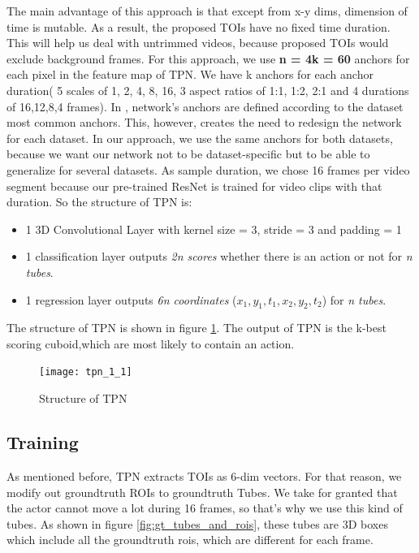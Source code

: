 The main advantage of this approach is that except from x-y dims, dimension of time is mutable. As a result, the proposed TOIs have
no fixed time duration. This will help us deal with untrimmed videos, because proposed TOIs would exclude background frames.
For this approach, we use \textbf{n = 4k = 60} anchors for each pixel in the feature map of TPN. We have k anchors for each anchor 
duration( 5 scales of 1, 2, 4, 8, 16, 3 aspect ratios of 1:1, 1:2, 2:1 and 4 durations of 16,12,8,4 frames).
In \cite{DBLP:journals/corr/HouCS17},  network's anchors are defined according to the dataset most common anchors. This, however,
creates the need to redesign the network for each dataset. In our approach, we use the same anchors for both datasets, because we want our network not
to be dataset-specific but to be able to generalize for several datasets. As sample duration, we chose 16 frames per video segment because
our pre-trained ResNet is trained for video clips with that duration.
So the structure of TPN is:
\begin{itemize}
\item 1 3D Convolutional Layer with kernel size = 3, stride = 3 and padding = 1
\item 1 classification layer outputs \textit{2n scores} whether there is an action or not for \textit{n tubes}.
\item 1 regression layer outputs \textit{6n coordinates} ($x_1,y_1,t_1,x_2,y_2,t_2$) for \textit{n tubes}.
\end{itemize}

The structure of TPN is shown in figure \ref{fig:tpn_1_1}. The output of TPN is the k-best scoring cuboid,which are most likely to contain an action.
\begin{figure}[h]

  \texttt{[image: tpn\_1\_1]}
  \caption{Structure of TPN}
  \label{fig:tpn_1_1}
\end{figure}

\subsection{Training}
As mentioned before, TPN extracts TOIs as 6-dim vectors. For that reason, we modify out groundtruth ROIs to groundtruth Tubes.
We take for granted that the actor cannot move a lot during 16 frames, so that's why we use this kind of tubes. As shown 
in figure \ref{fig:gt_tubes_and_rois}, these tubes are 3D boxes which include all the groundtruth rois, which are different
for each frame.

